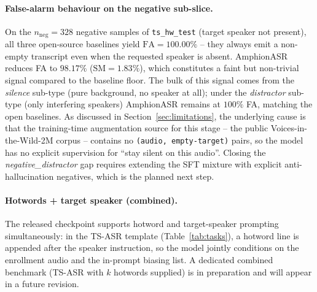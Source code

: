 \paragraph{False-alarm behaviour on the negative sub-slice.}
On the $n_\text{neg} = 328$ negative samples of
\texttt{ts\_hw\_test} (target speaker not present), all three
open-source baselines yield $\text{FA} = 100.00\%$ -- they always
emit a non-empty transcript even when the requested speaker is
absent. AmphionASR reduces FA to $98.17\%$ ($\text{SM} = 1.83\%$),
which constitutes a faint but non-trivial signal compared to the
baseline floor. The bulk of this signal comes from the
\emph{silence} sub-type (pure background, no speaker at all);
under the \emph{distractor} sub-type (only interfering speakers)
AmphionASR remains at $100\%$ FA, matching the open baselines. As
discussed in Section~\ref{sec:limitations}, the underlying cause
is that the training-time augmentation source for this stage --
the public Voices-in-the-Wild-2M corpus -- contains no
\texttt{(audio, empty-target)} pairs, so the model has no explicit
supervision for ``stay silent on this audio''. Closing the
\emph{negative\_distractor} gap requires extending the SFT mixture
with explicit anti-hallucination negatives, which is the planned
next step.

\paragraph{Hotwords + target speaker (combined).}
The released checkpoint supports hotword and target-speaker
prompting simultaneously: in the TS-ASR template
(Table~\ref{tab:tasks}), a hotword line is appended after the
speaker instruction, so the model jointly conditions on the
enrollment audio and the in-prompt biasing list. A dedicated
combined benchmark (TS-ASR with $k$ hotwords supplied) is in
preparation and will appear in a future revision.
